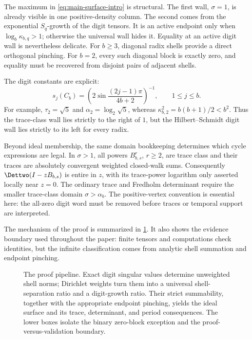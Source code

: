 The maximum in \cref{eq:main-surface-intro} is structural.  The first wall,
\(\sigma=1\), is already visible in one positive-density column.  The second
comes from the exponential \(S_q\)-growth of the digit tensors.  It is an
active endpoint only when \(\log_b\kappa_{b,q}>1\); otherwise the universal
wall hides it.  Equality at an active digit wall is nevertheless delicate.
For \(b\ge3\), diagonal radix shells provide a direct orthogonal pinching.
For \(b=2\), every such diagonal block is exactly zero, and equality must be
recovered from disjoint pairs of adjacent shells.

The digit constants are explicit:
\begin{equation}
  s_j(C_b)
  =
  (
    2\sin\frac{(2j-1)\pi}{4b+2}
  )^{-1},
  \qquad 1\le j\le b.
  \label{eq:digit-spectrum-intro}
\end{equation}
For example, \(\tau_2=\sqrt5\) and
\(\alpha_2=\log_2\sqrt5\), whereas
\(\kappa_{b,2}^2=b(b+1)/2<b^2\).  Thus the trace-class wall lies strictly
to the right of \(1\), but the Hilbert--Schmidt digit wall lies strictly to
its left for every radix.

Beyond ideal membership, the same domain bookkeeping determines which
cycle expressions are legal.  In \(\sigma>1\), all powers
\(B_{b,s}^r\), \(r\ge2\), are trace class and their traces are absolutely
convergent weighted closed-walk sums.  Consequently
\(\Dettwo(I-zB_{b,s})\) is entire in \(z\), with its trace-power logarithm
only asserted locally near \(z=0\).  The ordinary trace and Fredholm
determinant require the smaller trace-class domain
\(\sigma>\alpha_b\).  The positive-vertex convention is essential here:
the all-zero digit word must be removed before traces or temporal support
are interpreted.

The mechanism of the proof is summarized in \cref{fig:mechanism}.  It also
shows the evidence boundary used throughout the paper: finite tensors and
computations check identities, but the infinite classification comes from
analytic shell summation and endpoint pinching.

\begin{figure}[t]
  \centering
  \resizebox{\textwidth}{!}{}
  \caption{The proof pipeline.  Exact digit singular values determine
  unweighted shell norms; Dirichlet weights turn them into a universal
  shell-separation ratio and a digit-growth ratio.  Their strict
  summability, together with the appropriate endpoint pinching, yields the
  ideal surface and its trace, determinant, and period consequences.  The
  lower boxes isolate the binary zero-block exception and the
  proof-versus-validation boundary.}
  \label{fig:mechanism}
\end{figure}


